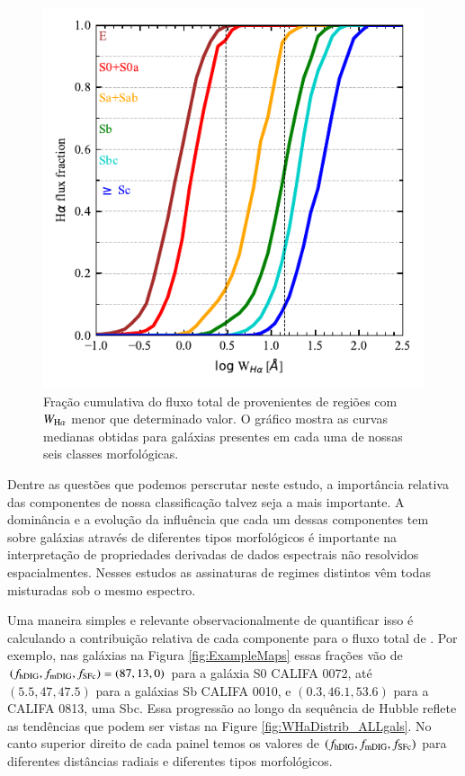 \begin{figure}
 \includegraphics{figuras/fig_cumul_fHaWHa_per_morftype.pdf}
 \caption[Fração cumulativa do fluxo de ${\rm H}\alpha$ com o crescimento de $W_{{\rm H}\alpha}$ para diferentes classes morfológicas]
 {Fração cumulativa do fluxo total de \Ha provenientes de regiões com $W_{\Ha}$ menor que determinado valor. O gráfico mostra as curvas medianas obtidas para galáxias presentes em cada uma de nossas seis classes morfológicas.}
 \label{fig:CurveOfGrowth}
\end{figure}

Dentre as questões que podemos perscrutar neste estudo, a importância relativa das componentes de nossa classificação talvez seja a mais importante. A dominância e a evolução da influência que cada um dessas componentes tem sobre galáxias através de diferentes tipos morfológicos é importante na interpretação de propriedades derivadas de dados espectrais não resolvidos espacialmentes. Nesses estudos as assinaturas de regimes distintos vêm todas misturadas sob o mesmo espectro.

Uma maneira simples e relevante observacionalmente de quantificar isso é calculando a contribuição relativa de cada componente para o fluxo total de \Ha. Por exemplo, nas galáxias na Figura \ref{fig:ExampleMaps} essas frações vão de $(f_{\rm hDIG} , f_{\rm mDIG} , f_{\rm SFc}) = (87,13,0)$ para a galáxia S0 CALIFA 0072, até $(5.5,47,47.5)$ para a galáxias Sb CALIFA 0010, e $(0.3,46.1,53.6)$ para a CALIFA 0813, uma Sbc. Essa progressão ao longo da sequência de Hubble reflete as tendências que podem ser vistas na Figure \ref{fig:WHaDistrib_ALLgals}. No canto superior direito de cada painel temos os valores de $(f_{\rm hDIG} , f_{\rm mDIG} , f_{\rm SFc})$ para diferentes distâncias radiais e diferentes tipos morfológicos.

